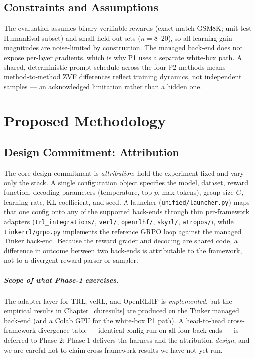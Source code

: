 \documentclass[12pt,a4paper]{report}
\begin{document}
\section{Constraints and Assumptions}
The evaluation assumes binary verifiable rewards (exact-match GSM8K; unit-test
HumanEval subset) and small held-out sets ($n=8$--$20$), so all learning-gain
magnitudes are noise-limited by construction. The managed back-end does not expose
per-layer gradients, which is why P1 uses a separate white-box path. A shared,
deterministic prompt schedule across the four P2 methods means method-to-method ZVF
differences reflect training dynamics, not independent samples --- an acknowledged
limitation rather than a hidden one.

\chapter{Proposed Methodology}
\label{ch:method}

\section{Design Commitment: Attribution}
\label{sec:harness}

The core design commitment is \emph{attribution}: hold the experiment fixed and vary
only the stack. A single configuration object specifies the model, dataset, reward
function, decoding parameters (temperature, top-$p$, max tokens), group size $G$,
learning rate, KL coefficient, and seed. A launcher (\texttt{unified/launcher.py})
maps that one config onto any of the supported back-ends through thin per-framework
adapters (\texttt{trl\_integrations/}, \texttt{verl/}, \texttt{openrlhf/},
\texttt{skyrl/}, \texttt{atropos/}), while \texttt{tinkerrl/grpo.py} implements the
reference GRPO loop against the managed Tinker back-end. Because the reward grader
and decoding are shared code, a difference in outcome between two back-ends is
attributable to the framework, not to a divergent reward parser or sampler.

\paragraph{Scope of what Phase-1 exercises.} The adapter layer for TRL, veRL, and
OpenRLHF is \emph{implemented}, but the empirical results in Chapter~\ref{ch:results}
are produced on the Tinker managed back-end (and a Colab GPU for the white-box P1
path). A head-to-head cross-framework divergence table --- identical config run on all
four back-ends --- is deferred to Phase-2; Phase-1 delivers the harness and the
attribution \emph{design}, and we are careful not to claim cross-framework results we
have not yet run.
\end{document}
